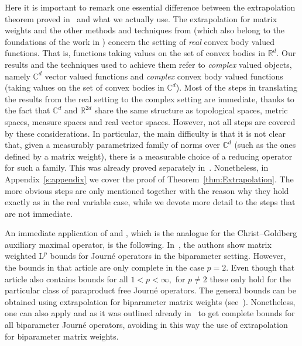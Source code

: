\documentclass{article}
\theoremstyle{definition}
\theoremstyle{remark}
\numberwithin{equation}{section}
\newcommand{\reals}{\mathbb{R}}
\newcommand{\complex}{\mathbb{C}}
\newcommand{\Lp}[1]{\mathrm{L}^{#1}}
\newcommand{\1}{\mathbf{1}}
\begin{document}
    Here it is important to remark one essential difference between the extrapolation theorem proved in~\cite{Cruz_Uribe_Bownik_Extrapolation} and what we actually use.
    The extrapolation for matrix weights and the other methods and techniques from \cite{Cruz_Uribe_Bownik_Extrapolation} (which also belong to the foundations of the work in \cite{Kakaroumpas_Nguyen_Vardakis_2024}) concern the setting of \emph{real} convex body valued functions. That is, functions taking values on the set of convex bodies in $\reals^d.$
    Our results and the techniques used to achieve them refer to \emph{complex} valued objects, namely $\complex^d$ vector valued functions and \emph{complex} convex body valued functions (taking values on the set of convex bodies in $\complex^d$).
    Most of the steps in translating the results from the real setting to the complex setting are immediate, thanks to the fact that $\complex^d$ and $\reals^{2d}$ share the same structure as topological spaces, metric spaces, measure spaces and real vector spaces.
    However, not all steps are covered by these considerations.
    In particular, the main difficulty is that it is not clear that,
    given a measurably parametrized family of norms over $\complex^d$
    (such as the ones defined by a matrix weight), there is a measurable choice of a reducing operator for such a family.
    This was already proved separately in~\cite{DKPS2024}.
    Nonetheless, in Appendix~\ref{s:appendix} we cover the proof of Theorem~\ref{thm:Extrapolation}.
    The more obvious steps are only mentioned together with the reason why they hold
    exactly as in the real variable case,
    while we devote more detail to the steps that are not immediate.

    An immediate application of 
    and , which is the analogue for the Christ--Goldberg auxiliary maximal operator, is the following.
    In~\cite{DKPS2024}, the authors show matrix weighted $\Lp{p}$ bounds
    for Journé operators in the biparameter setting.
    However, the bounds in that article are only complete in the case $p = 2.$
    Even though that article also contains bounds for all $1 < p < \infty,$
    for $p \neq 2$ these only hold for the particular class of paraproduct free
    Journé operators.
    The general bounds can be obtained using extrapolation for biparameter matrix weights
    (see~\cite{Vuorinen2024}).
    Nonetheless, one can also apply 
    and 
    as it was outlined already in~\cite[Section~8]{DKPS2024} to get complete bounds
    for all biparameter Journé operators,
    avoiding in this way the use of extrapolation for biparameter matrix weights.
    
\end{document}
